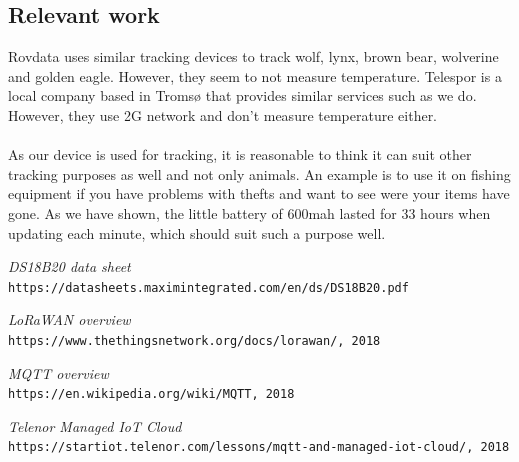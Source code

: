 		
	
	\subsection{Relevant work}
		Rovdata uses similar tracking devices to track wolf, lynx, brown bear, wolverine and golden eagle. However, they seem to not measure temperature. Telespor is a local company based in Tromsø that provides similar services such as we do. However, they use 2G network and don't measure temperature either. \\\\
		As our device is used for tracking, it is reasonable to think it can suit other tracking purposes as well and not only animals. An example is to use it on fishing equipment if you have problems with thefts and want to see were your items have gone. As we have shown, the little battery of 600mah lasted for 33 hours when updating each minute, which should suit such a purpose well. 
	

		

\begin{thebibliography}{9}
	\textit{DS18B20 data sheet}
	\\\texttt {https://datasheets.maximintegrated.com/en/ds/DS18B20.pdf}
	
	\textit{LoRaWAN overview}
	\\\texttt {https://www.thethingsnetwork.org/docs/lorawan/, 2018}
	
	\textit{MQTT overview}
	\\\texttt {https://en.wikipedia.org/wiki/MQTT, 2018}
	
	\textit{Telenor Managed IoT Cloud}
	\\\texttt{https://startiot.telenor.com/lessons/mqtt-and-managed-iot-cloud/, 2018}
	
	
\end{thebibliography}

